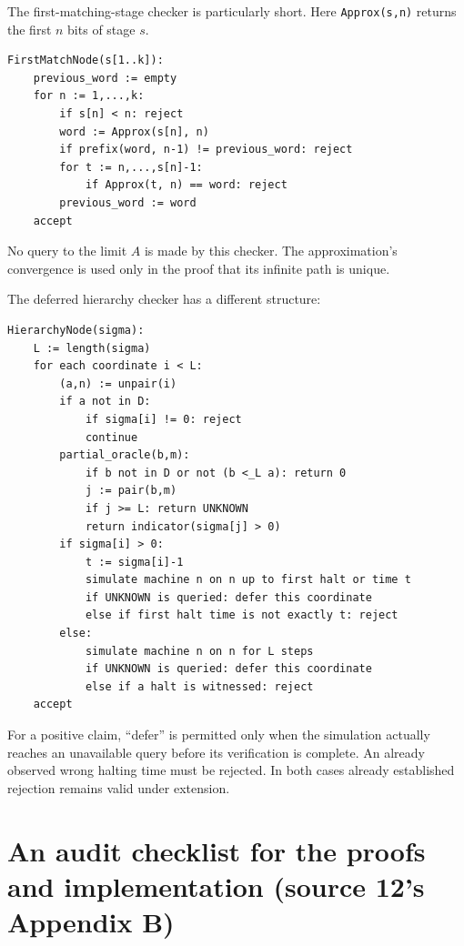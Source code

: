 \documentclass[11pt,letterpaper]{article}
\theoremstyle{definition}
\theoremstyle{remark}
\newcommand{\code}[1]{\texttt{#1}}
\newcommand{\1}{\mathbf 1}
\newcommand{\srctag}[1]{\texorpdfstring{\hspace{0.4em}{\normalfont\small\color{accent}[source #1]}}{ [source #1]}}
\begin{document}
The first-matching-stage checker is particularly short. Here
\code{Approx(s,n)} returns the first $n$ bits of stage $s$.
\begin{lstlisting}
FirstMatchNode(s[1..k]):
    previous_word := empty
    for n := 1,...,k:
        if s[n] < n: reject
        word := Approx(s[n], n)
        if prefix(word, n-1) != previous_word: reject
        for t := n,...,s[n]-1:
            if Approx(t, n) == word: reject
        previous_word := word
    accept
\end{lstlisting}
No query to the limit $A$ is made by this checker. The approximation's
convergence is used only in the proof that its infinite path is unique.

The deferred hierarchy checker has a different structure:
\begin{lstlisting}
HierarchyNode(sigma):
    L := length(sigma)
    for each coordinate i < L:
        (a,n) := unpair(i)
        if a not in D:
            if sigma[i] != 0: reject
            continue
        partial_oracle(b,m):
            if b not in D or not (b <_L a): return 0
            j := pair(b,m)
            if j >= L: return UNKNOWN
            return indicator(sigma[j] > 0)
        if sigma[i] > 0:
            t := sigma[i]-1
            simulate machine n on n up to first halt or time t
            if UNKNOWN is queried: defer this coordinate
            else if first halt time is not exactly t: reject
        else:
            simulate machine n on n for L steps
            if UNKNOWN is queried: defer this coordinate
            else if a halt is witnessed: reject
    accept
\end{lstlisting}
For a positive claim, ``defer'' is permitted only when the simulation
actually reaches an unavailable query before its verification is complete.
An already observed wrong halting time must be rejected. In both cases
already established rejection remains valid under extension.

\section{An audit checklist for the proofs and implementation (source 12's Appendix B)\srctag{12}}\label{lbh:cs:app:audit}
\end{document}
